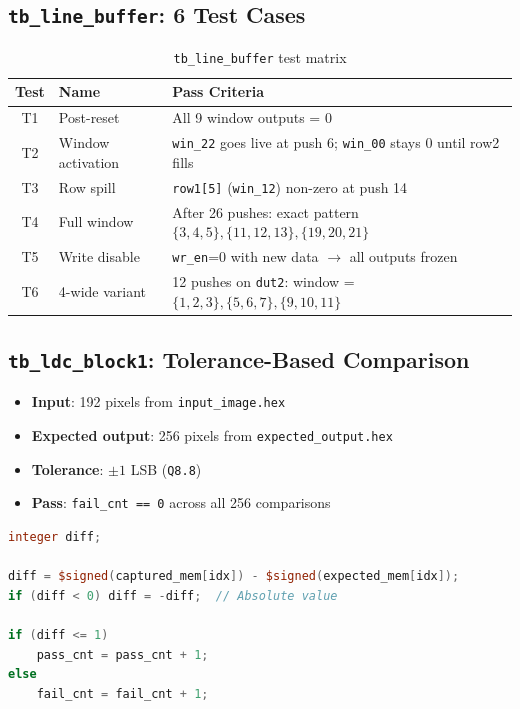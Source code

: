 \documentclass[11pt,a4paper]{report}
\newcommand{\qformat}[1]{\texttt{\color{accentcolor}#1}}
\newcommand{\signal}[1]{\texttt{\color{datacolor}#1}}
\newcommand{\regname}[1]{\texttt{\color{memorycolor}#1}}
\begin{document}
\subsection{\texttt{tb\_line\_buffer}: 6 Test Cases}

\begin{table}[h]
\centering
\begin{tabular}{@{}clp{8cm}@{}}
\toprule
\textbf{Test} & \textbf{Name} & \textbf{Pass Criteria} \\
\midrule
T1 & Post-reset & All 9 window outputs = 0 \\
T2 & Window activation & \signal{win\_22} goes live at push 6; \signal{win\_00} stays 0 until row2 fills \\
T3 & Row spill & \regname{row1[5]} (\signal{win\_12}) non-zero at push 14 \\
T4 & Full window & After 26 pushes: exact pattern $\{3,4,5\}, \{11,12,13\}, \{19,20,21\}$ \\
T5 & Write disable & \signal{wr\_en}=0 with new data $\rightarrow$ all outputs frozen \\
T6 & 4-wide variant & 12 pushes on \texttt{dut2}: window = $\{1,2,3\}, \{5,6,7\}, \{9,10,11\}$ \\
\bottomrule
\end{tabular}
\caption{\texttt{tb\_line\_buffer} test matrix}
\end{table}

\subsection{\texttt{tb\_ldc\_block1}: Tolerance-Based Comparison}

\begin{itemize}[leftmargin=2em]
    \item \textbf{Input}: 192 pixels from \texttt{input\_image.hex}
    \item \textbf{Expected output}: 256 pixels from \texttt{expected\_output.hex}
    \item \textbf{Tolerance}: $\pm 1$ LSB (\qformat{Q8.8})
    \item \textbf{Pass}: \texttt{fail\_cnt == 0} across all 256 comparisons
\end{itemize}

\begin{lstlisting}[language=Verilog, caption={Block1 tolerance comparison}]
integer diff;

diff = $signed(captured_mem[idx]) - $signed(expected_mem[idx]);
if (diff < 0) diff = -diff;  // Absolute value

if (diff <= 1)
    pass_cnt = pass_cnt + 1;
else
    fail_cnt = fail_cnt + 1;
\end{lstlisting}
\end{document}
